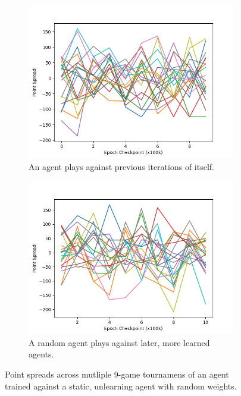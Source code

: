 \begin{figure}
\center

\begin{subfigure}[b]{0.90\textwidth}
	\includegraphics[width=\linewidth]{images/findings/round2/spreads_self-v-prev_random.png}
	\caption{An agent plays against previous iterations of itself.}
	\label{fig:r2-spreads-random-a}
\end{subfigure}

\begin{subfigure}[b]{0.90\textwidth}
	\includegraphics[width=\linewidth]{images/findings/round2/spreads_rand-v-fut_random.png}
	\caption{A random agent plays against later, more learned agents.}
	\label{fig:r2-spreads-random-b}
\end{subfigure}


\caption{
	Point spreads across mutliple 9-game tournamens of an agent
	trained against a static, unlearning agent with random weights.
}
\label{fig:r2-spreads-random}
\end{figure}
